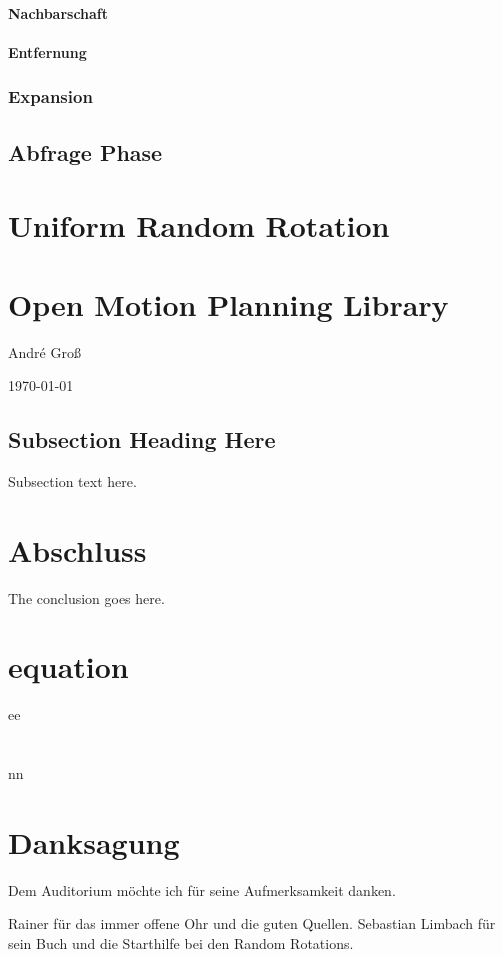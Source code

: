 \documentclass[journal]{IEEEtran}
\begin{document}
\paragraph{Nachbarschaft}
\paragraph{Entfernung}
\subsubsection{Expansion}
\subsection{Abfrage Phase}

\section{Uniform Random Rotation}
\section{Open Motion Planning Library}


\hfill André Groß
 
\hfill \today

\subsection{Subsection Heading Here}
Subsection text here.

\section{Abschluss}
The conclusion goes here.

\appendices
\section{equation}
ee

\section{}
nn

\section*{Danksagung}
Dem Auditorium möchte ich für seine Aufmerksamkeit danken.

Rainer für das immer offene Ohr und die guten Quellen. Sebastian Limbach für sein Buch und die Starthilfe bei den Random Rotations.
\end{document}
